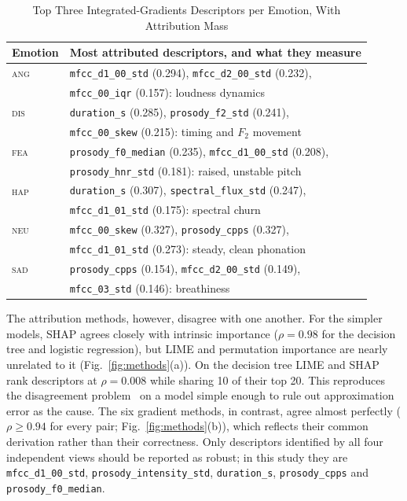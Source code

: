 \documentclass[lettersize,journal]{IEEEtran}
\newcommand{\ttf}[1]{\texttt{\footnotesize #1}}
\begin{document}
\begin{table}[!t]
\caption{Top Three Integrated-Gradients Descriptors per Emotion, With Attribution Mass}
\label{tab:peremotion}
\centering
\scriptsize
\setlength{\tabcolsep}{4pt}
\begin{tabular}{@{}ll@{}}
\toprule
Emotion & Most attributed descriptors, and what they measure\\
\midrule
\textsc{ang} & \ttf{mfcc\_d1\_00\_std} (0.294), \ttf{mfcc\_d2\_00\_std} (0.232),\\
             & \ttf{mfcc\_00\_iqr} (0.157): loudness dynamics\\[2pt]
\textsc{dis} & \ttf{duration\_s} (0.285), \ttf{prosody\_f2\_std} (0.241),\\
             & \ttf{mfcc\_00\_skew} (0.215): timing and $F_2$ movement\\[2pt]
\textsc{fea} & \ttf{prosody\_f0\_median} (0.235), \ttf{mfcc\_d1\_00\_std} (0.208),\\
             & \ttf{prosody\_hnr\_std} (0.181): raised, unstable pitch\\[2pt]
\textsc{hap} & \ttf{duration\_s} (0.307), \ttf{spectral\_flux\_std} (0.247),\\
             & \ttf{mfcc\_d1\_01\_std} (0.175): spectral churn\\[2pt]
\textsc{neu} & \ttf{mfcc\_00\_skew} (0.327), \ttf{prosody\_cpps} (0.327),\\
             & \ttf{mfcc\_d1\_01\_std} (0.273): steady, clean phonation\\[2pt]
\textsc{sad} & \ttf{prosody\_cpps} (0.154), \ttf{mfcc\_d2\_00\_std} (0.149),\\
             & \ttf{mfcc\_03\_std} (0.146): breathiness\\
\bottomrule
\end{tabular}
\end{table}

The attribution methods, however, disagree with one another. For the simpler
models, SHAP agrees closely with intrinsic importance ($\rho=0.98$ for the decision tree and
logistic regression), but LIME and permutation importance are nearly unrelated
to it (Fig.~\ref{fig:methods}(a)). On the decision tree LIME and SHAP rank
descriptors at $\rho=0.008$ while sharing 10 of their top 20. This reproduces
the disagreement problem~\cite{krishna2022disagreement} on a model simple
enough to rule out approximation error as the cause. The six gradient methods,
in contrast, agree almost perfectly ($\rho\geq0.94$ for every pair;
Fig.~\ref{fig:methods}(b)), which reflects their common derivation rather than
their correctness. Only descriptors identified by all four independent views
should be reported as robust; in this study they are \ttf{mfcc\_d1\_00\_std},
\ttf{prosody\_intensity\_std}, \ttf{duration\_s}, \ttf{prosody\_cpps} and
\ttf{prosody\_f0\_median}.
\end{document}
